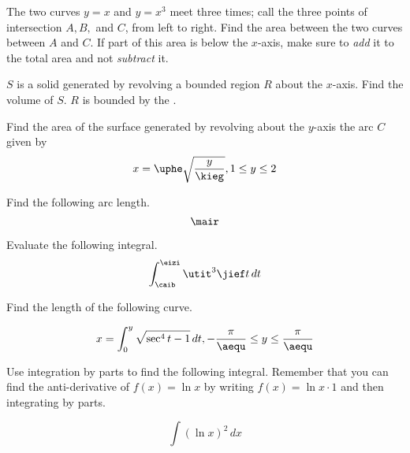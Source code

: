  The two curves $y=x$ and $y=x^{3}$ meet three times; call the three points of intersection $A,B,$ and $C$, from left to right. Find the area between the two curves between $A$ and $C$. If part of this area is below the $x$-axis, make sure to \emph{add} it to the total area and not \emph{subtract} it.

 $S$ is a solid generated by revolving a bounded region $R$ about the $x$-axis. Find the volume of $S$. $R$ is bounded by the {\ufoj}. {\afie}

 Find the area of the surface generated by revolving about the $y$-axis the arc $C$ given by
\begin{equation}
  \label{eq:aiquuojo}
  x={\uphe}\sqrt{\frac{y}{\kieg}},1\leq{}y\leq{}2  
\end{equation}

 Find the following arc length.
\begin{equation}
  \label{eq:eedookuo}
  {\mair}
\end{equation}

 Evaluate the following integral.
\begin{equation}
  \label{eq:teingahg}
  \int_{{\caib}}^{{\eizi}}{\utit}^{3}{\jief}t\,dt
\end{equation}

 Find the length of the following curve.

\begin{equation}
  \label{eq:thoageib}
  x=\int_{0}^{y}\sqrt{\sec^{4}t-1}\,dt,-\frac{\pi}{\aequ}\leq{}y\leq\frac{\pi}{\aequ}
\end{equation}

 Use integration by parts to find the following integral. Remember that you can find the anti-derivative of $f(x)=\ln{}x$ by writing $f(x)=\ln{}x\cdot{}1$ and then integrating by parts.

\begin{equation}
  \label{eq:nophieyu}
  \int\left(\ln{}x\right)^{2}\,dx
\end{equation}
